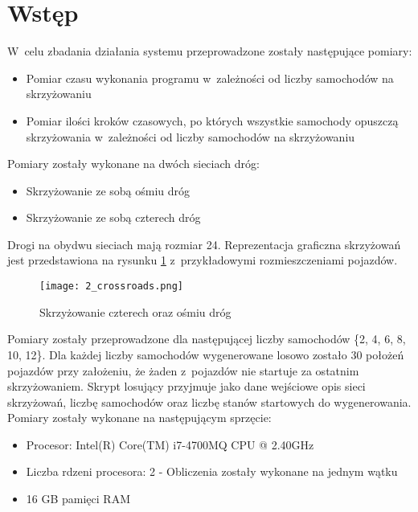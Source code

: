  \label{chap:outcomes}

\section{Wstęp}

W~celu zbadania działania systemu przeprowadzone zostały następujące pomiary:
\begin{itemize}
\item Pomiar czasu wykonania programu w~zależności od liczby samochodów na skrzyżowaniu 
\item Pomiar ilości kroków czasowych, po których wszystkie samochody opuszczą skrzyżowania w~zależności od liczby samochodów na skrzyżowaniu
\end{itemize}

Pomiary zostały wykonane na dwóch sieciach dróg:
\begin{itemize}
\item Skrzyżowanie ze sobą ośmiu dróg
\item Skrzyżowanie ze sobą czterech dróg
\end{itemize}

Drogi na obydwu sieciach mają rozmiar 24. Reprezentacja graficzna skrzyżowań jest przedstawiona na rysunku \ref{both-crossroads} z~przykładowymi rozmieszczeniami pojazdów.
\begin{figure}[H]
    \texttt{[image: 2\_crossroads.png]}
  \caption{Skrzyżowanie czterech oraz ośmiu dróg}
  \label{both-crossroads}
\end{figure}

Pomiary zostały przeprowadzone dla następującej liczby samochodów \{2, 4, 6, 8, 10, 12\}. Dla każdej liczby samochodów wygenerowane losowo zostało 30 położeń pojazdów przy założeniu, że żaden z~pojazdów nie startuje za ostatnim skrzyżowaniem. Skrypt losujący przyjmuje jako dane wejściowe opis sieci skrzyżowań, liczbę samochodów oraz liczbę stanów startowych do wygenerowania.
\newline
\newline
Pomiary zostały wykonane na następującym sprzęcie:
\begin{itemize}
\item Procesor: Intel(R) Core(TM) i7-4700MQ CPU @ 2.40GHz
\item Liczba rdzeni procesora: 2 - Obliczenia zostały wykonane na jednym wątku
\item 16 GB pamięci RAM
\end{itemize}

